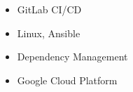 \begin{itemize}
    \item GitLab CI/CD
    \item Linux, Ansible
    \item Dependency Management
    \item Google Cloud Platform
\end{itemize}